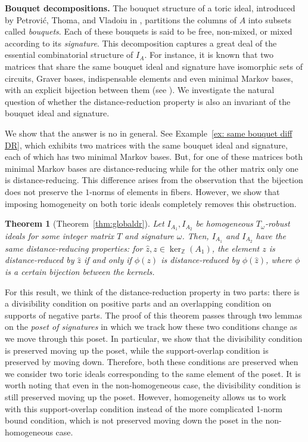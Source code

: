 \documentclass[a4paper, 12pt]{article}
\newcommand{\ZZ}{\mathbb Z}
\theoremstyle{plain}
\newtheorem*{theorem*}{Theorem}
\theoremstyle{definition}
\theoremstyle{remark}
\begin{document}
\medskip \noindent 
\textbf{Bouquet decompositions.} The bouquet structure of a toric ideal, introduced by Petrovi\'c, Thoma, and Vladoiu in \cite{petrovic2018bouquet}, partitions the columns of $A$ into subsets called \emph{bouquets}.
Each of these bouquets is said to be free, non-mixed, or mixed according to its \emph{signature}. 
This decomposition captures a great deal of the essential combinatorial structure of $I_A$.
For instance, it is known that two matrices that share the same bouquet ideal and signature have isomorphic sets of circuits, Graver bases, indispensable elements and even minimal Markov bases, with an explicit bijection between them (see \cite{petrovic2018bouquet, kosta2023strongly}).
We investigate the natural question of whether the distance-reduction property is also an invariant of the bouquet ideal and signature.


We show that the answer is no in general. See Example~\ref{ex: same bouquet diff DR}, which exhibits two matrices with the same bouquet ideal and signature, each of which has two minimal Markov bases. But, for one of these matrices both minimal Markov bases are distance-reducing while for the other matrix only one is distance-reducing. This difference arises from the observation that the bijection does not preserve the $1$-norms of elements in fibers. 
However, we show that imposing homogeneity on both toric ideals completely removes this obstruction.


\begin{theorem*}[Theorem~\ref{thm:globaldr}]
    Let $I_{A_1},I_{A_2}$ be homogeneous $T_{\omega}$-robust ideals for some integer matrix $T$ and signature $\omega$. Then, $I_{A_1}$ and $I_{A_2}$ have the same distance-reducing properties: for $\hat z,z \in \ker_\ZZ(A_1)$, the element $z$ is distance-reduced by $\hat z$ if and only if $\phi(z)$ is distance-reduced by $\phi(\hat z)$, where $\phi$ is a certain bijection between the kernels.
\end{theorem*}


For this result, we think of the distance-reduction property in two parts: 
there is a divisibility condition on positive parts and an overlapping condition on supports of negative parts.
The proof of this theorem passes through two lemmas on the \emph{poset of signatures} in which we track how
these two conditions change as we move through this poset. 
In particular, we show that the divisibility condition is preserved moving up the poset, 
while the support-overlap condition is preserved by moving down. 
Therefore, both these conditions are preserved when we consider two toric ideals corresponding to the same element of the poset. 
It is worth noting that even in the non-homogeneous case, the divisibility condition is still preserved moving up the poset. However, homogeneity allows us to work with this support-overlap condition instead of the more complicated 1-norm bound condition, which is not preserved moving down the poset in the non-homogeneous case.
\end{document}
